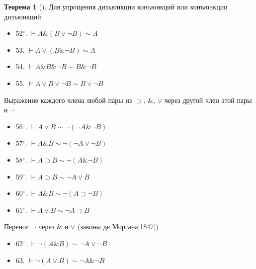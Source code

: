 \documentclass[a4paper, 12pt]{article}  %
\DeclareMathOperator{\conj}{\mathbb{\&}}
\theoremstyle{definition}
\newtheorem{theorem}{Теорема}
\begin{document}
\begin{theorem}[]
		Для упрощения дизъюнкции конъюнкций или конъюнкции дизъюнкций
		\begin{itemize}[label={}]
			\setlength\itemsep{0pt}	
			\item 52$^\circ$. $\vdash A \conj (B \vee \neg B) \sim A$		
			\item 53. $\vdash A \vee (B \conj \neg B) \sim A$		
			\item 54. $\vdash A \conj B \conj \neg B \sim B \conj \neg B$		
			\item 55. $\vdash A \vee B \vee \neg B \sim B \vee \neg B$
		\end{itemize}
		
		Выражение каждого члена любой пары из $\supset$, $\conj$, $\vee$ через другой член этой пары и $\neg$
		\begin{itemize}[label={}]
			\setlength\itemsep{0pt}	
			\item 56$^\circ$. $\vdash A \vee B \sim \neg (\neg A \conj \neg B)$	
			\item 57$^\circ$. $\vdash A \conj B \sim \neg (\neg A \vee \neg B)$	
			\item 58$^\circ$. $\vdash A \supset B \sim \neg (A \conj \neg B)$	
			\item 59$^\circ$. $\vdash A \supset B \sim \neg A \vee B$	
			\item 60$^\circ$. $\vdash A \conj B \sim \neg (A \supset \neg B)$		
			\item 61$^\circ$. $\vdash A \vee B \sim \neg A \supset B$
		\end{itemize}
		
		Перенос $\neg$ через $\conj$ и $\vee$ (законы де Моргана[1847])
		\begin{itemize}[label={}]
			\setlength\itemsep{0pt}	
			\item 62$^\circ$. $\vdash \neg (A \conj B) \sim \neg A \vee \neg B$
			\item 63. $\vdash \neg (A \vee B) \sim \neg A \conj \neg B$
		\end{itemize}
		

\end{theorem}
\end{document}
